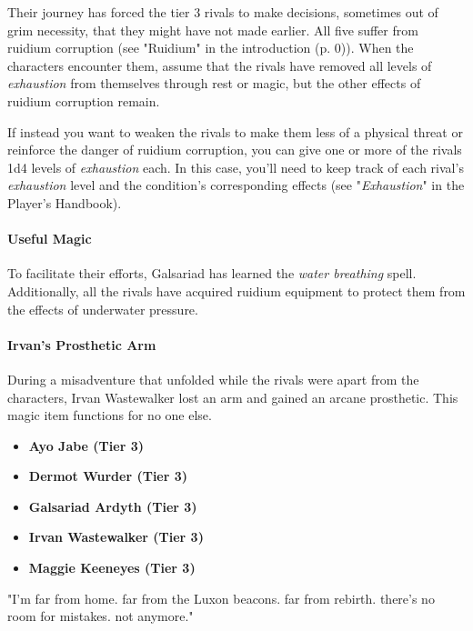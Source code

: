 \documentclass[letterpaper, 11pt, bg=full, twocolumn]{dndbook}
\begin{document}
Their journey has forced the tier 3 rivals to make decisions, sometimes out of grim necessity, that they might have not made earlier. All five suffer from ruidium corruption (see "Ruidium" in the introduction (p. 0)). When the characters encounter them, assume that the rivals have removed all levels of \textit{exhaustion} from themselves through rest or magic, but the other effects of ruidium corruption remain.


If instead you want to weaken the rivals to make them less of a physical threat or reinforce the danger of ruidium corruption, you can give one or more of the rivals 1d4 levels of \textit{exhaustion} each. In this case, you'll need to keep track of each rival's \textit{exhaustion} level and the condition's corresponding effects (see "\textit{Exhaustion}" in the Player's Handbook).

\paragraph{Useful Magic}

To facilitate their efforts, Galsariad has learned the \textit{water breathing} spell. Additionally, all the rivals have acquired ruidium equipment to protect them from the effects of underwater pressure.

\paragraph{Irvan's Prosthetic Arm}

During a misadventure that unfolded while the rivals were apart from the characters, Irvan Wastewalker lost an arm and gained an arcane prosthetic. This magic item functions for no one else.

\begin{itemize}
\item \textbf{Ayo Jabe (Tier 3)}
\item \textbf{Dermot Wurder (Tier 3)}
\item \textbf{Galsariad Ardyth (Tier 3)}
\item \textbf{Irvan Wastewalker (Tier 3)}
\item \textbf{Maggie Keeneyes (Tier 3)}
\end{itemize}

\begin{DndReadAloud}
"I'm far from home. far from the Luxon beacons. far from rebirth. there's no room for mistakes. not anymore."
\end{DndReadAloud}
\end{document}
